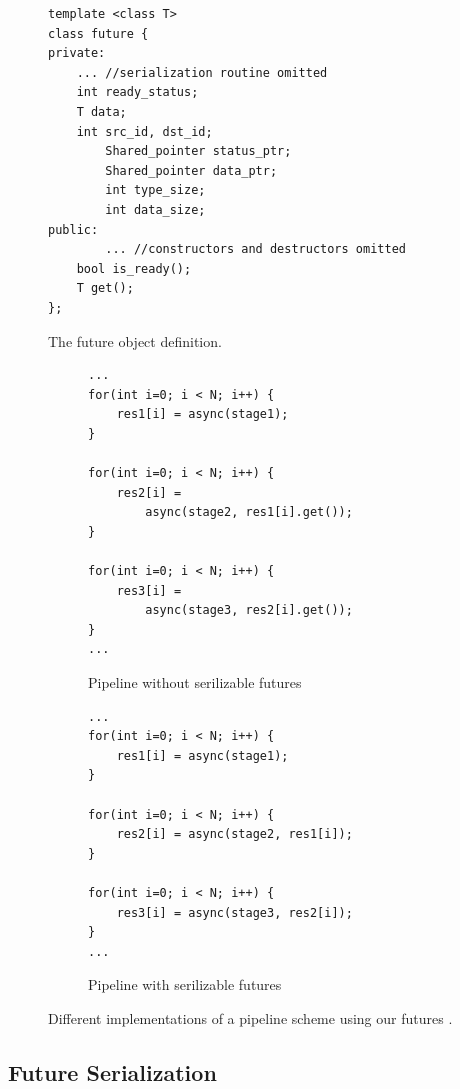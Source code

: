 \begin{figure}[!ht]
\begin{lstlisting}
template <class T>
class future {
private:
	... //serialization routine omitted
    int ready_status;
    T data;
    int src_id, dst_id;
		Shared_pointer status_ptr;
		Shared_pointer data_ptr;
		int type_size;
		int data_size;
public:
		... //constructors and destructors omitted
    bool is_ready();
    T get();
};
\end{lstlisting}
\caption{The future object definition.}
\label{lst:future_object}
\end{figure}

\begin{figure}
\begin{subfigure}[b]{.6\textwidth}
\begin{minipage}{.48\textwidth}
\begin{lstlisting}
...
for(int i=0; i < N; i++) {
	res1[i] = async(stage1);
}

for(int i=0; i < N; i++) {
	res2[i] = 
		async(stage2, res1[i].get());
} 

for(int i=0; i < N; i++) {
	res3[i] = 
		async(stage3, res2[i].get());
} 
...
\end{lstlisting}
\caption{Pipeline without serilizable futures}
\label{lst:pipe_futures_a}
\end{minipage}
\end{subfigure}
\hfill
\begin{subfigure}[b]{.6\textwidth}
\begin{minipage}{.48\textwidth}

\begin{lstlisting}
...
for(int i=0; i < N; i++) {
	res1[i] = async(stage1);
}

for(int i=0; i < N; i++) {
	res2[i] = async(stage2, res1[i]);
} 

for(int i=0; i < N; i++) {
	res3[i] = async(stage3, res2[i]);
} 
...
\end{lstlisting}
\caption{Pipeline with serilizable futures}
\label{lst:pipe_futures_b}
\end{minipage}
\end{subfigure}
\caption{	Different implementations of a pipeline scheme using our futures .}
\end{figure}

\subsection{Future Serialization}
